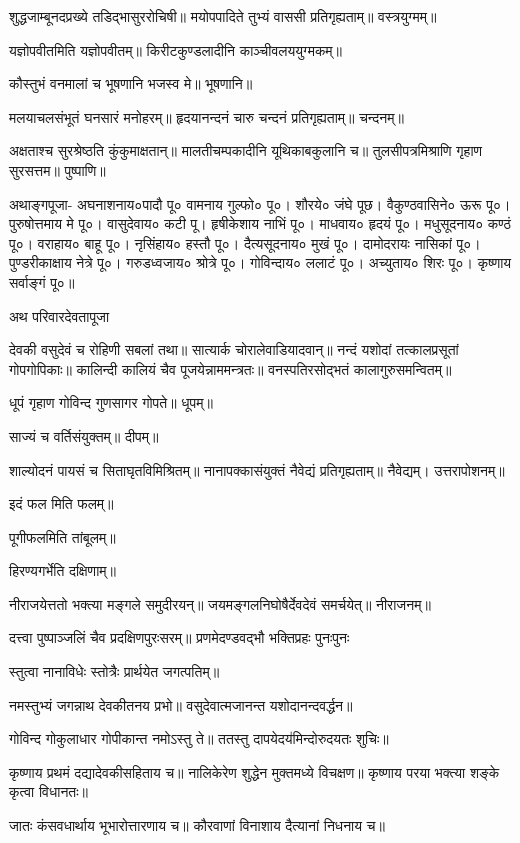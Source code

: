 शुद्धजाम्बूनदप्रख्ये तडिद्भासुररोचिषी॥
मयोपपादिते तुभ्यं वाससी प्रतिगृह्यताम्॥
वस्त्रयुग्मम्॥

यज्ञोपवीतमिति यज्ञोपवीतम्॥
किरीटकुण्डलादीनि काञ्चीवलययुग्मकम्॥

कौस्तुभं वनमालां च भूषणानि भजस्व मे॥
भूषणानि॥

मलयाचलसंभूतं घनसारं मनोहरम्॥
हृदयानन्दनं चारु चन्दनं प्रतिगृह्यताम्॥
चन्दनम्॥

अक्षताश्च सुरश्रेष्ठति कुंकुमाक्षतान्॥
मालतीचम्पकादीनि यूथिकाबकुलानि च॥
तुलसीपत्रमिश्राणि गृहाण सुरसत्तम॥
पुष्पाणि॥



अथाङ्गपूजा-
अघनाशनाय०पादौ पू०
वामनाय गुल्फो० पू०।
शौरये० जंघे पूछ।
वैकुण्ठवासिने० ऊरू पू०।
पुरुषोत्तमाय मे पू०।
वासुदेवाय० कटी पू।
हृषीकेशाय नाभिं पू०।
माधवाय० हृदयं पू०।
मधुसूदनाय० कण्ठं पू०।
वराहाय० बाहू पू०।
नृसिंहाय० हस्तौ पू०।
दैत्यसूदनाय० मुखं पू०।
दामोदरायः नासिकां पू०।
पुण्डरीकाक्षाय नेत्रे पू०।
गरुडध्वजाय० श्रोत्रे पू०।
गोविन्दाय० ललाटं पू०।
अच्युताय० शिरः पू०।
कृष्णाय सर्वाङ्गं पू०॥


अथ परिवारदेवतापूजा

देवकी वसुदेवं च रोहिणी सबलां तथा॥
सात्यार्क चोरालेवाडियादवान्॥
नन्दं यशोदां तत्कालप्रसूतां गोपगोपिकाः॥
कालिन्दी कालियं चैव पूजयेन्नाममन्त्रतः॥
वनस्पतिरसोद्भतं कालागुरुसमन्वितम्॥

धूपं गृहाण गोविन्द गुणसागर गोपते॥
धूपम्॥

साज्यं च वर्तिसंयुक्तम्॥
दीपम्॥

शाल्योदनं पायसं च सिताघृतविमिश्रितम्॥
नानापक्कासंयुक्तं नैवेद्यं प्रतिगृह्यताम्॥
नैवेद्यम्।
उत्तरापोशनम्॥

इदं फल मिति फलम्॥

पूगीफलमिति तांबूलम्॥

हिरण्यगर्भेति दक्षिणाम्॥

नीराजयेत्ततो भक्त्या मङ्गले समुदीरयन्॥
जयमङ्गलनिघोषैर्देवदेवं समर्चयेत्॥
नीराजनम्॥


दत्त्वा पुष्पाञ्जलिं चैव प्रदक्षिणपुरःसरम्॥
प्रणमेदण्डवद्भौ भक्तिप्रहः पुनःपुनः

स्तुत्वा नानाविधेः स्तोत्रैः प्रार्थयेत जगत्पतिम्॥

नमस्तुभ्यं जगन्नाथ देवकीतनय प्रभो॥
वसुदेवात्मजानन्त यशोदानन्दवर्द्धन॥

गोविन्द गोकुलाधार गोपीकान्त नमोऽस्तु ते॥
ततस्तु दापयेदय॑मिन्दोरुदयतः शुचिः॥

कृष्णाय प्रथमं दद्यादेवकीसहिताय च॥
नालिकेरेण शुद्धेन मुक्तमध्ये विचक्षण॥
कृष्णाय परया भक्त्या शङ्के कृत्वा विधानतः॥

जातः कंसवधार्थाय भूभारोत्तारणाय च॥
कौरवाणां विनाशाय दैत्यानां निधनाय च॥

